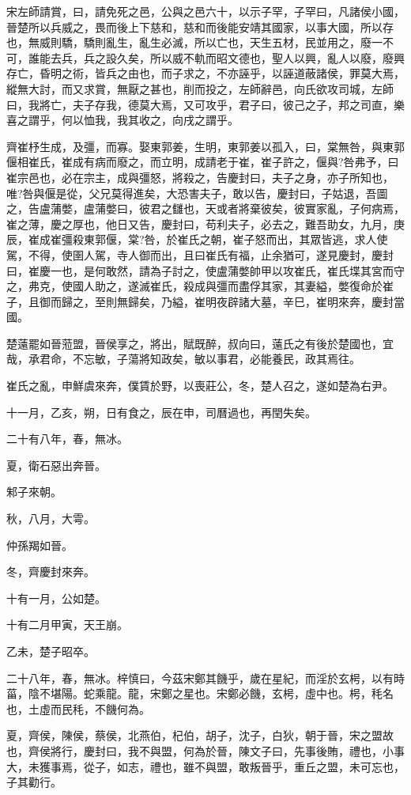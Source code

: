 \begin{pinyinscope}
宋左師請賞，曰，請免死之邑，公與之邑六十，以示子罕，子罕曰，凡諸侯小國，晉楚所以兵威之，畏而後上下慈和，慈和而後能安靖其國家，以事大國，所以存也，無威則驕，驕則亂生，亂生必滅，所以亡也，天生五材，民並用之，廢一不可，誰能去兵，兵之設久矣，所以威不軌而昭文德也，聖人以興，亂人以廢，廢興存亡，昏明之術，皆兵之由也，而子求之，不亦誣乎，以誣道蔽諸侯，罪莫大焉，縱無大討，而又求賞，無厭之甚也，削而投之，左師辭邑，向氏欲攻司城，左師曰，我將亡，夫子存我，德莫大焉，又可攻乎，君子曰，彼己之子，邦之司直，樂喜之謂乎，何以恤我，我其收之，向戌之謂乎。

齊崔杼生成，及彊，而寡。娶東郭姜，生明，東郭姜以孤入，曰，棠無咎，與東郭偃相崔氏，崔成有病而廢之，而立明，成請老于崔，崔子許之，偃與?咎弗予，曰崔宗邑也，必在宗主，成與彊怒，將殺之，告慶封曰，夫子之身，亦子所知也，唯?咎與偃是從，父兄莫得進矣，大恐害夫子，敢以告，慶封曰，子姑退，吾圖之，告盧蒲嫳，盧蒲嫳曰，彼君之讎也，天或者將棄彼矣，彼實家亂，子何病焉，崔之薄，慶之厚也，他日又告，慶封曰，苟利夫子，必去之，難吾助女，九月，庚辰，崔成崔彊殺東郭偃，棠?咎，於崔氏之朝，崔子怒而出，其眾皆逃，求人使駕，不得，使圉人駕，寺人御而出，且曰崔氏有福，止余猶可，遂見慶封，慶封曰，崔慶一也，是何敢然，請為子討之，使盧蒲嫳帥甲以攻崔氏，崔氏堞其宮而守之，弗克，使國人助之，遂滅崔氏，殺成與彊而盡俘其家，其妻縊，嫳復命於崔子，且御而歸之，至則無歸矣，乃縊，崔明夜辟諸大墓，辛巳，崔明來奔，慶封當國。

楚薳罷如晉蒞盟，晉侯享之，將出，賦既醉，叔向曰，薳氏之有後於楚國也，宜哉，承君命，不忘敏，子蕩將知政矣，敏以事君，必能養民，政其焉往。

崔氏之亂，申鮮虞來奔，僕賃於野，以喪莊公，冬，楚人召之，遂如楚為右尹。

十一月，乙亥，朔，日有食之，辰在申，司曆過也，再閏失矣。

二十有八年，春，無冰。

夏，衛石惡出奔晉。

邾子來朝。

秋，八月，大雩。

仲孫羯如晉。

冬，齊慶封來奔。

十有一月，公如楚。

十有二月甲寅，天王崩。

乙未，楚子昭卒。

二十八年，春，無冰。梓慎曰，今茲宋鄭其饑乎，歲在星紀，而淫於玄枵，以有時菑，陰不堪陽。蛇乘龍。龍，宋鄭之星也。宋鄭必饑，玄枵，虛中也。枵，秏名也，土虛而民秏，不饑何為。

夏，齊侯，陳侯，蔡侯，北燕伯，杞伯，胡子，沈子，白狄，朝于晉，宋之盟故也，齊侯將行，慶封曰，我不與盟，何為於晉，陳文子曰，先事後賄，禮也，小事大，未獲事焉，從子，如志，禮也，雖不與盟，敢叛晉乎，重丘之盟，未可忘也，子其勸行。


\end{pinyinscope}
